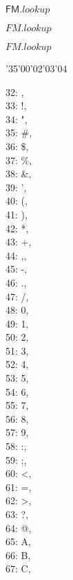 \documentclass{article}
\begin{document}
$\mbox{}$

$\mathsf{FM}.\mathit{lookup}$

$\mathit{FM}.\mathit{lookup}$

$\mathit{FM.lookup}$

{\tentex\char'35\char'00\char'02\char'03\char'04}

{\ttfamily\begin{tabbing}
32:  , \\
33: !, \\
34: ", \\
35: \#, \\
36: \$, \\
37: \%, \\
38: \&, \\
39: ', \\
40: (, \\
41: ), \\
42: *, \\
43: +, \\
44: ,, \\
45: -, \\
46: ., \\
47: /, \\
48: 0, \\
49: 1, \\
50: 2, \\
51: 3, \\
52: 4, \\
53: 5, \\
54: 6, \\
55: 7, \\
56: 8, \\
57: 9, \\
58: :, \\
59: ;, \\
60: <, \\
61: =, \\
62: >, \\
63: ?, \\
64: @, \\
65: A, \\
66: B, \\
67: C, \\

\end{tabbing}}
\end{document}
